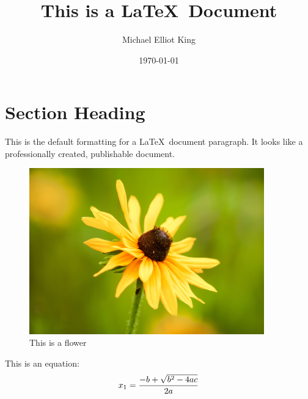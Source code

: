 \documentclass[12pt, notitlepage]{article}
\title{This is a \LaTeX\ Document}
\author{Michael Elliot King}
\date{\today}
\begin{document}
\maketitle

\section{Section Heading}
This is the default formatting for a \LaTeX\ document paragraph.  It looks like a professionally created, publishable document.

\begin{figure}[h]
	\centering
	\includegraphics[width=4in]{flower.jpg}
	\caption{This is a flower}\label{flower}
\end{figure}

This is an equation:
\begin{equation}\label{find_root}
		x_{1} = {{-b + \sqrt{b^{2}-4ac}} \over {2a}}
\end{equation}
\end{document}
